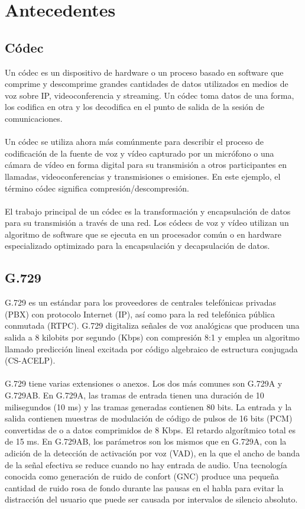 \documentclass[11pt,letterpaper]{article}
\begin{document}


\newpage
\tableofcontents
\listoffigures

\newpage
\section{Antecedentes}
\subsection{Códec}
Un códec es un dispositivo de hardware o un proceso basado en software que comprime y 
descomprime grandes cantidades de datos utilizados en medios de voz sobre IP, 
videoconferencia y streaming. Un códec toma datos de una forma, los codifica en otra y los 
decodifica en el punto de salida de la sesión de comunicaciones.
\\ \\
Un códec se utiliza ahora más comúnmente para describir el proceso de codificación de la 
fuente de voz y vídeo capturado por un micrófono o una cámara de vídeo en forma digital 
para su transmisión a otros participantes en llamadas, videoconferencias y transmisiones 
o emisiones. En este ejemplo, el término códec significa compresión/descompresión.
\\ \\
El trabajo principal de un códec es la transformación y encapsulación de datos para su 
transmisión a través de una red. Los códecs de voz y vídeo utilizan un algoritmo de 
software que se ejecuta en un procesador común o en hardware especializado optimizado 
para la encapsulación y decapsulación de datos.

\subsection{G.729}
G.729 es un estándar para los proveedores de centrales telefónicas privadas (PBX) con 
protocolo Internet (IP), así como para la red telefónica pública conmutada (RTPC). G.729 
digitaliza señales de voz analógicas que producen una salida a 8 kilobits por segundo (Kbps) 
con compresión 8:1 y emplea un algoritmo llamado predicción lineal excitada por código 
algebraico de estructura conjugada (CS-ACELP).
\\ \\
G.729 tiene varias extensiones o anexos. Los dos más comunes son G.729A y G.729AB. 
En G.729A, las tramas de entrada tienen una duración de 10 milisegundos (10 ms) y las 
tramas generadas contienen 80 bits. La entrada y la salida contienen muestras de modulación 
de código de pulsos de 16 bits (PCM) convertidas de o a datos comprimidos de 8 Kbps. 
El retardo algorítmico total es de 15 ms. En G.729AB, los parámetros son los mismos que 
en G.729A, con la adición de la detección de activación por voz (VAD), en la que el ancho 
de banda de la señal efectiva se reduce cuando no hay entrada de audio. Una tecnología 
conocida como generación de ruido de confort (GNC) produce una pequeña cantidad de ruido 
rosa de fondo durante las pausas en el habla para evitar la distracción del usuario que 
puede ser causada por intervalos de silencio absoluto.
\end{document}

